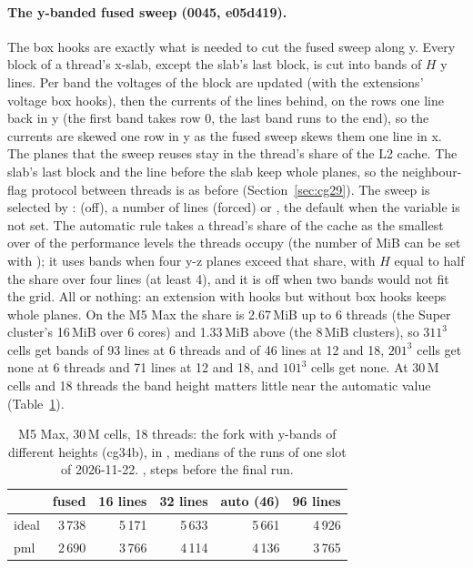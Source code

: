 \paragraph{The y-banded fused sweep (0045, e05d419).} The box hooks are exactly what is needed to cut the fused sweep along
y. Every block of a thread's x-slab, except the slab's last block, is cut into bands of $H$ y lines. Per band the
voltages of the block are updated (with the extensions' voltage box hooks), then the currents of the lines behind, on the
rows one line back in y (the first band takes row 0, the last band runs to the end), so the currents are skewed one row in y
as the fused sweep skews them one line in x. The planes that the sweep reuses stay in the thread's share of the L2 cache. The slab's last block
and the line before the slab keep whole planes, so the neighbour-flag protocol between threads is as before (Section~\ref{sec:cg29}).
The sweep is selected by :  (off), a number of lines (forced) or , the default
when the variable is not set. The automatic rule takes a thread's share of the cache as the smallest
 over  of the performance levels the threads occupy (the number of MiB can
be set with ); it uses bands when four y-z planes exceed that share, with $H$ equal to half
the share over four lines (at least 4), and it is off when two bands would not fit the grid. All or nothing: an
extension with hooks but without box hooks keeps whole planes.
On the M5 Max the share is 2.67\,MiB up to 6 threads (the Super cluster's 16\,MiB over 6 cores) and 1.33\,MiB above (the
8\,MiB clusters), so $311^3$ cells get bands of 93 lines at 6 threads and of 46 lines at 12 and 18, $201^3$ cells get
none at 6 threads and 71 lines at 12 and 18, and $101^3$ cells get none. At 30\,M cells and 18 threads the band height
matters little near the automatic value (Table~\ref{tab:largeband}).

\begin{table}[H]\centering\small
\begin{tabular}{@{}lrrrrr@{}}
\toprule
 & fused & 16 lines & 32 lines & auto (46) & 96 lines \\
\midrule
ideal & 3\,738 & 5\,171 & 5\,633 & 5\,661 & 4\,926 \\
pml & 2\,690 & 3\,766 & 4\,114 & 4\,136 & 3\,765 \\
\bottomrule
\end{tabular}
\caption{M5 Max, 30\,M cells, 18 threads: the fork with y-bands of different heights (cg34b), in \MC, medians of the runs of
one slot of 2026-11-22. , steps before the final run.}\label{tab:largeband}
\end{table}

